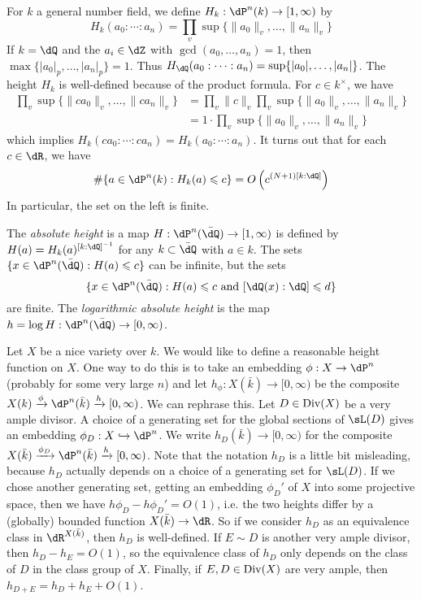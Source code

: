 For $k$ a general number field, we define $H_k:\dP^n(k)\to [1,\infty)$ by 
\[
  H_k(a_0:\cdots:a_n) = \prod_v \sup\{ \|a_0\|_v,\dots,\|a_n\|_v\}
\]
If $k=\dQ$ and the $a_i\in \dZ$ with $\gcd(a_0,\dots,a_n)=1$, then 
$\max\{|a_0|_p,\dots,|a_n|_p\}=1$. Thus 
$H_\dQ(a_0:\cdots:a_n)=\sup\{|a_0|,\dots,|a_n|\}$. The height $H_k$ is 
well-defined because of the product formula. For $c\in k^\times$, we have 
\begin{align*}
  \prod_v \sup\{\|ca_0\|_v,\dots,\|ca_n\|_v\} 
    &= \prod_v \|c\|_v \prod_v \sup\{\|a_0\|_v,\dots,\|a_n\|_v\} \\
    &= 1\cdot \prod_v \sup\{\|a_0\|_v,\dots,\|a_n\|_v\}
\end{align*}
which implies $H_k(c a_0:\cdots:c a_n)=H_k(a_0:\cdots:a_n)$. It turns out that 
for each $c\in \dR$, we have  
\[
  \#\{a\in \dP^n(k) : H_k(a)\leqslant c\} = O\left(c^{(N+1)[k:\dQ]}\right)
\]
In particular, the set on the left is finite. 

The \emph{absolute height} is a map $H:\dP^n(\bar\dQ)\to [1,\infty)$ is defined 
by $H(a) = H_k(a)^{[k:\dQ]^{-1}}$ for any $k\subset \bar\dQ$ with $a\in k$. 
The sets $\{x\in \dP^n(\bar\dQ):H(a)\leqslant c\}$ can be infinite, but the 
sets 
\[
  \{x\in \dP^n(\bar\dQ):H(a)\leqslant c\text{ and } [\dQ(x):\dQ]\leqslant d\}
\]
are finite. The \emph{logarithmic absolute height} is the map 
$h=\log H:\dP^n(\bar\dQ)\to [0,\infty)$. 

Let $X$ be a nice variety over $k$. We would like to define a reasonable height 
function on $X$. One way to do this is to take an embedding $\phi:X\to \dP^n$ 
(probably for some very large $n$) and let $h_\phi:X(\bar k)\to [0,\infty)$ be 
the composite $X(k) \xrightarrow\phi \dP^n(\bar k) \xrightarrow{h} [0,\infty)$. 
We can rephrase this. Let $D\in \operatorname{Div}(X)$ be a very ample divisor. A choice of a 
generating set for the global sections of $\sL(D)$ gives an embedding 
$\phi_D:X\hookrightarrow \dP^n$. We write $h_D(\bar k)\to [0,\infty)$ for the 
composite 
$X(\bar k) \xrightarrow{\phi_D} \dP^n(\bar k)\xrightarrow{h} [0,\infty)$. Note 
that the notation $h_D$ is a little bit misleading, because $h_D$ actually 
depends on a choice of a generating set for $\sL(D)$. If we chose another 
generating set, getting an embedding $\phi_D'$ of $X$ into some projective 
space, then we have $h \phi_D - h \phi_D'=O(1)$, i.e. the two heights differ by 
a (globally) bounded function $X(\bar k)\to \dR$. So if we consider 
$h_D$ as an equivalence class in $\dR^{X(\bar k)}$, then $h_D$ is well-defined. 
If $E\sim D$ is another very ample divisor, then $h_D-h_E=O(1)$, so the 
equivalence class of $h_D$ only depends on the class of $D$ in the class group 
of $X$. Finally, if $E,D\in \operatorname{Div}(X)$ are very ample, then 
$h_{D+E}=h_D+h_E+O(1)$. 

